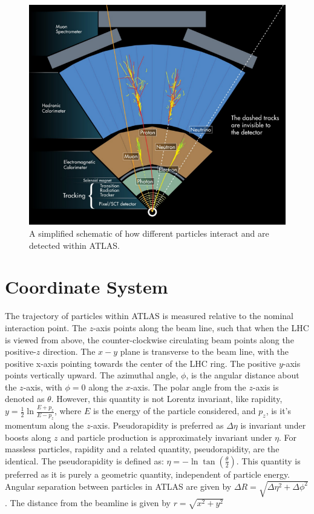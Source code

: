 \begin{figure}[h!]
  \centering
  \includegraphics[width=\hsize]{figures/Detector/particle_detection_atlas.png}
  \caption{A simplified schematic of how different particles interact and are detected within ATLAS.} 
  \label{fig:particle_detection}
\end{figure}
\FloatBarrier

\section{Coordinate System}
The trajectory of particles within ATLAS is measured relative to the nominal interaction point. The $z$-axis points along the beam line, such that when the LHC is viewed from above, the counter-clockwise circulating beam points along the positive-$z$ direction. The $x-y$ plane is transverse to the beam line, with the positive x-axis pointing towards the center of the LHC ring. The positive $y$-axis points vertically upward. The azimuthal angle, $\phi$, is the angular distance about the $z$-axis, with $\phi=0$ along the $x$-axis. The polar angle from the $z$-axis is denoted as $\theta$.  However, this quantity is not Lorentz invariant, like rapidity, $y=\frac{1}{2}\ln\frac{E+p_{z}}{E-p_{z}}$, where $E$ is the energy of the particle considered, and $p_{z}$, is it's momentum along the $z$-axis. Pseudorapidity is preferred as $\Delta \eta$ is invariant under boosts along $z$ and particle production is approximately invariant under $\eta$. For massless particles, rapidity and a related quantity, pseudorapidity, are the identical. The pseudorapidity is defined as: $\eta = -\ln \tan(\frac{\theta}{2})$.  This quantity is preferred as it is purely a geometric quantity, independent of particle energy. Angular separation between particles in ATLAS are given by $\Delta R = \sqrt{\Delta \eta^{2}+\Delta \phi^{2}}$. The distance from the beamline is given by $r=\sqrt{x^{2}+y^{2}}$
 
